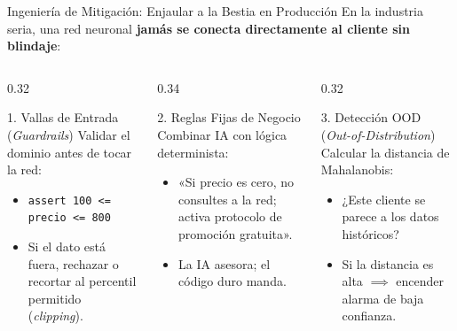 \documentclass[10pt,aspectratio=169]{beamer}
\begin{document}
\begin{frame}{Ingeniería de Mitigación: Enjaular a la Bestia en Producción}
  En la industria seria, una red neuronal \textbf{jamás se conecta directamente al cliente sin blindaje}:
  \vspace{0.15cm}

  \begin{columns}[T]
    \begin{column}{0.32\textwidth}
      \begin{block}{1. Vallas de Entrada (\textit{Guardrails})}
        \scriptsize
        Validar el dominio antes de tocar la red:
        \begin{itemize}
          \item \texttt{assert 100 <= precio <= 800}
          \item Si el dato está fuera, rechazar o recortar al percentil permitido (\textit{clipping}).
        \end{itemize}
      \end{block}
    \end{column}

    \begin{column}{0.34\textwidth}
      \begin{block}{2. Reglas Fijas de Negocio}
        \scriptsize
        Combinar IA con lógica determinista:
        \begin{itemize}
          \item «Si precio es cero, no consultes a la red; activa protocolo de promoción gratuita».
          \item La IA asesora; el código duro manda.
        \end{itemize}
      \end{block}
    \end{column}

    \begin{column}{0.32\textwidth}
      \begin{block}{3. Detección OOD (\textit{Out-of-Distribution})}
        \scriptsize
        Calcular la distancia de Mahalanobis:
        \begin{itemize}
          \item ¿Este cliente se parece a los datos históricos?
          \item Si la distancia es alta $\implies$ encender alarma de baja confianza.
        \end{itemize}
      \end{block}
    \end{column}
  \end{columns}
\end{frame}
\end{document}
